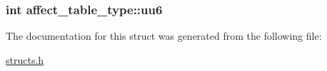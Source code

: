 \hypertarget{structaffect__table__type_aa47ec4b4ee8d20202a044673e8165882}{
\subsubsection[{uu6}]{\setlength{\rightskip}{0pt plus 5cm}int affect\-\_\-table\-\_\-type\-::uu6}}\label{structaffect__table__type_aa47ec4b4ee8d20202a044673e8165882}


The documentation for this struct was generated from the following file\-:\begin{DoxyCompactItemize}
\item 
\hyperlink{structs_8h}{structs.\-h}\end{DoxyCompactItemize}
